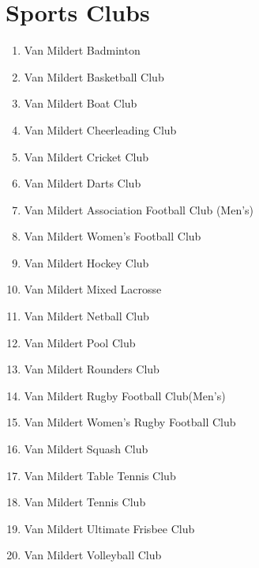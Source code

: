 \documentclass[12pt]{article}  %
\begin{document}
\section{Sports Clubs}
\begin{enumerate}[]
    \item Van Mildert Badminton
    \item Van Mildert Basketball Club
    \item Van Mildert Boat Club
    \item Van Mildert Cheerleading Club
    \item Van Mildert Cricket Club
    \item Van Mildert Darts Club
    \item Van Mildert Association Football Club (Men's)
    \item Van Mildert Women's Football Club
    \item Van Mildert Hockey Club
    \item Van Mildert Mixed Lacrosse
    \item Van Mildert Netball Club
    \item Van Mildert Pool Club
    \item Van Mildert Rounders Club
    \item Van Mildert Rugby Football Club(Men’s)
    \item Van Mildert Women's Rugby Football Club
    \item Van Mildert Squash Club
    \item Van Mildert Table Tennis Club
    \item Van Mildert Tennis Club
    \item Van Mildert Ultimate Frisbee Club
    \item Van Mildert Volleyball Club
\end{enumerate}
\end{document}
